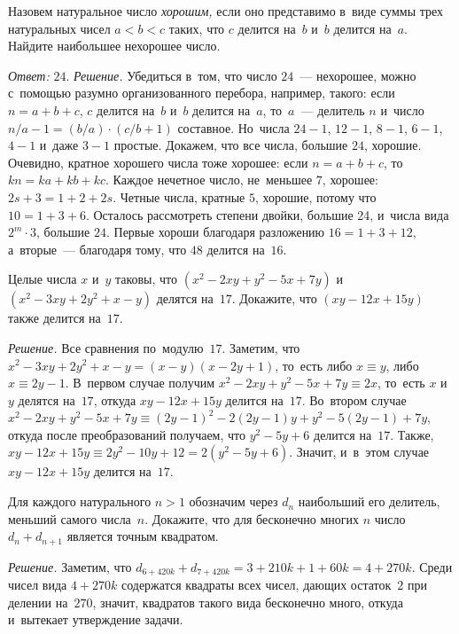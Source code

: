 \begin{problems}
Назовем натуральное число \emph{хорошим,} если оно представимо в~виде суммы
трех натуральных чисел $a < b < c$ таких, что $c$ делится на~$b$ и~$b$
делится на~$a$.
Найдите наибольшее нехорошее число.

 \textit{Ответ:} $24$.
 \textit{Решение.}
 Убедиться в~том, что число $24$~--- нехорошее, можно с~помощью разумно
 организованного перебора, например, такого: если $n = a + b + c$,
 $c$ делится на~$b$ и~$b$ делится на~$a$, то~$a$~--- делитель $n$ и~число
 $n / a - 1 = (b / a) \cdot (c / b + 1)$ составное.
 Но~числа $24 - 1$, $12 - 1$, $8 - 1$, $6 - 1$, $4 - 1$ и~даже $3 - 1$ простые.
 Докажем, что все числа, большие $24$, хорошие.
 Очевидно, кратное хорошего числа тоже хорошее: если $n = a + b + c$,
 то~$k n = k a + k b + k c$.
 Каждое нечетное число, не~меньшее $7$, хорошее: $2 s + 3 = 1 + 2 + 2 s$.
 Четные числа, кратные $5$, хорошие, потому что $10 = 1+3+6$.
 Осталось рассмотреть степени двойки, большие 24, и~числа вида $2^{m} \cdot 3$,
 большие $24$.
 Первые хороши благодаря разложению $16 = 1 + 3 + 12$, а~вторые~--- благодаря
 тому, что $48$ делится на~$16$.

Целые числа $x$ и~$y$ таковы, что $(x^2 - 2 x y + y^2 - 5 x + 7 y)$
и~$(x^2 - 3 x y + 2 y^2 + x - y)$ делятся на~$17$.
Докажите, что $(x y - 12 x + 15 y)$ также делится на~$17$.

 \emph{Решение.}
 Все сравнения по~модулю~$17$.
 Заметим, что $x^2 - 3 x y + 2 y^2 + x - y = (x - y) (x - 2 y + 1)$, то~есть
 либо $x \equiv y$, либо $x \equiv 2 y - 1$.
 В~первом случае получим $x^2 - 2 x y + y^2 - 5 x + 7 y \equiv 2 x$, то~есть
 $x$ и~$y$ делятся на~$17$, откуда $x y - 12 x + 15 y$ делится на~$17$.
 Во~втором случае
 \(
     x^2 - 2 x y + y^2 - 5 x + 7 y
 \equiv
     (2 y - 1)^2 - 2 (2 y - 1) y + y^2 - 5 (2 y - 1) + 7 y
 \), откуда после преобразований получаем, что $y^2 - 5 y + 6$ делится на~$17$.
 Также,
 \(
     x y - 12 x + 15 y
 \equiv
     2 y^2 - 10 y + 12
 =
     2 (y^2 - 5 y + 6)
 \).
 Значит, и~в~этом случае $x y - 12 x + 15 y$ делится на~$17$.

Для каждого натурального $n > 1$ обозначим через $d_{n}$ наибольший его
делитель, меньший самого числа~$n$.
Докажите, что для бесконечно многих $n$ число $d_{n} + d_{n+1}$ является
точным квадратом.

 \textit{Решение.}
 Заметим, что $d_{6+420k} + d_{7+420k} = 3 + 210 k + 1 + 60k = 4 + 270 k$.
 Среди чисел вида $4 + 270 k$ содержатся квадраты всех чисел, дающих
 остаток~$2$ при делении на~$270$, значит, квадратов такого вида бесконечно
 много, откуда и~вытекает утверждение задачи.

\end{problems}

